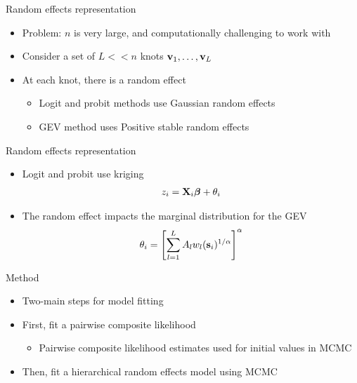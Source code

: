 \documentclass{beamer}
\begin{document}
\begin{frame}{Random effects representation}
\begin{itemize}
  \item Problem: $n$ is very large, and computationally challenging to work with
  \item Consider a set of $L << n$ knots $\mbox{\bf v}_1, \ldots, \mbox{\bf v}_L$
  \item At each knot, there is a random effect
  \begin{itemize}
    \item Logit and probit methods use Gaussian random effects
    \item GEV method uses Positive stable random effects
  \end{itemize}
\end{itemize}
\end{frame}

\begin{frame}{Random effects representation}
  \begin{itemize}
    \item Logit and probit use kriging
    \begin{align*}
      z_i = \mbox{\bf X}_i \mbox{\boldmath $\beta$} + \theta_i
    \end{align*}
    \item The random effect impacts the marginal distribution for the GEV
    \begin{align*}
      \theta_i = \left[\sum_{l = 1}^L A_l w_l(\mbox{\bf s}_i)^{1 / \alpha}\right]^{\alpha}
    \end{align*}

  \end{itemize}
\end{frame}

\begin{frame}{Method}
  \begin{itemize}
    \item Two-main steps for model fitting
    \item First, fit a pairwise composite likelihood
    \begin{itemize}
      \item Pairwise composite likelihood estimates used for initial values in MCMC
    \end{itemize}
    \item Then, fit a hierarchical random effects model using MCMC
  \end{itemize}
\end{frame}
\end{document}

